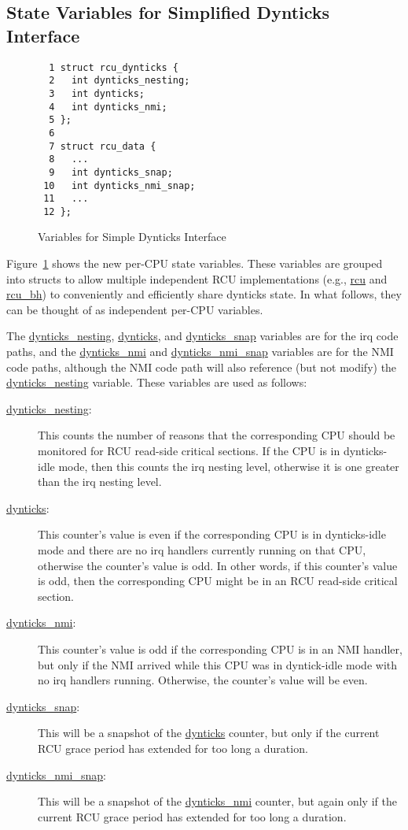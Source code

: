 \subsection{State Variables for Simplified Dynticks Interface}
\label{app:formal:State Variables for Simplified Dynticks Interface}

\begin{figure}[tbp]
{ \scriptsize
\begin{verbatim}
  1 struct rcu_dynticks {
  2   int dynticks_nesting;
  3   int dynticks;
  4   int dynticks_nmi;
  5 };
  6 
  7 struct rcu_data {
  8   ...
  9   int dynticks_snap;
 10   int dynticks_nmi_snap;
 11   ...
 12 };
\end{verbatim}
}
\caption{Variables for Simple Dynticks Interface}
\label{fig:app:formal:Variables for Simple Dynticks Interface}
\end{figure}

Figure~\ref{fig:app:formal:Variables for Simple Dynticks Interface}
shows the new per-CPU state variables.
These variables are grouped into structs to allow multiple independent
RCU implementations (e.g., \url{rcu} and \url{rcu_bh}) to conveniently
and efficiently share dynticks state.
In what follows, they can be thought of as independent per-CPU variables.

The \url{dynticks_nesting}, \url{dynticks}, and \url{dynticks_snap} variables
are for the irq code paths, and the \url{dynticks_nmi} and
\url{dynticks_nmi_snap} variables are for the NMI code paths, although
the NMI code path will also reference (but not modify) the
\url{dynticks_nesting} variable.
These variables are used as follows:

\begin{description}
\item[\url{dynticks_nesting}:]
	This counts the number of reasons that the corresponding
	CPU should be monitored for RCU read-side critical sections.
	If the CPU is in dynticks-idle mode, then this counts the
	irq nesting level, otherwise it is one greater than the
	irq nesting level.
\item[\url{dynticks}:]
	This counter's value is even if the corresponding CPU is
	in dynticks-idle mode and there are no irq handlers currently
	running on that CPU, otherwise the counter's value is odd.
	In other words, if this counter's value is odd, then the
	corresponding CPU might be in an RCU read-side critical section.
\item[\url{dynticks_nmi}:]
	This counter's value is odd if the corresponding CPU is
	in an NMI handler, but only if the NMI arrived while this
	CPU was in dyntick-idle mode with no irq handlers running.
	Otherwise, the counter's value will be even.
\item[\url{dynticks_snap}:]
	This will be a snapshot of the \url{dynticks} counter, but
	only if the current RCU grace period has extended for too
	long a duration.
\item[\url{dynticks_nmi_snap}:]
	This will be a snapshot of the \url{dynticks_nmi} counter, but
	again only if the current RCU grace period has extended for too
	long a duration.
\end{description}

